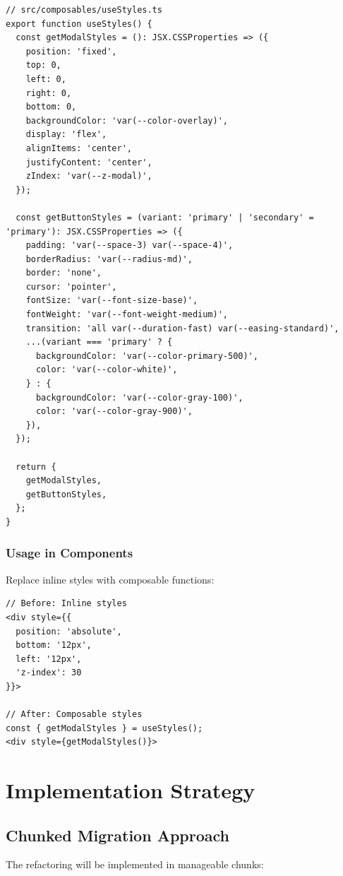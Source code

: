 \documentclass[11pt]{article}
\begin{document}
\begin{lstlisting}[style=typescript]
// src/composables/useStyles.ts
export function useStyles() {
  const getModalStyles = (): JSX.CSSProperties => ({
    position: 'fixed',
    top: 0,
    left: 0,
    right: 0,
    bottom: 0,
    backgroundColor: 'var(--color-overlay)',
    display: 'flex',
    alignItems: 'center',
    justifyContent: 'center',
    zIndex: 'var(--z-modal)',
  });

  const getButtonStyles = (variant: 'primary' | 'secondary' = 'primary'): JSX.CSSProperties => ({
    padding: 'var(--space-3) var(--space-4)',
    borderRadius: 'var(--radius-md)',
    border: 'none',
    cursor: 'pointer',
    fontSize: 'var(--font-size-base)',
    fontWeight: 'var(--font-weight-medium)',
    transition: 'all var(--duration-fast) var(--easing-standard)',
    ...(variant === 'primary' ? {
      backgroundColor: 'var(--color-primary-500)',
      color: 'var(--color-white)',
    } : {
      backgroundColor: 'var(--color-gray-100)',
      color: 'var(--color-gray-900)',
    }),
  });

  return {
    getModalStyles,
    getButtonStyles,
  };
}
\end{lstlisting}

\subsubsection{Usage in Components}

Replace inline styles with composable functions:

\begin{lstlisting}[style=typescript]
// Before: Inline styles
<div style={{ 
  position: 'absolute', 
  bottom: '12px', 
  left: '12px', 
  'z-index': 30 
}}>

// After: Composable styles
const { getModalStyles } = useStyles();
<div style={getModalStyles()}>
\end{lstlisting}

\section{Implementation Strategy}

\subsection{Chunked Migration Approach}

The refactoring will be implemented in manageable chunks:
\end{document}
